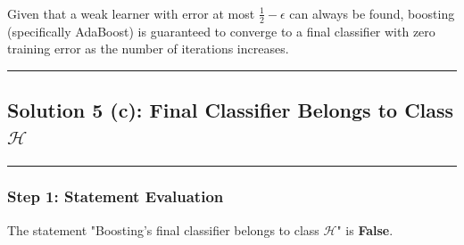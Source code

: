 \documentclass{article}
\begin{document}
\subsubsection*{}
\parbox{\textwidth}{
Given that a weak learner with error at most $\tfrac12 - \epsilon$ can always be found, boosting (specifically AdaBoost) is guaranteed to converge to a final classifier with zero training error as the number of iterations increases.
}

\noindent\rule{\textwidth}{0.4pt}

\newpage

\subsection*{Solution 5 (c): Final Classifier Belongs to Class $\mathcal H$}
\noindent\rule{\textwidth}{0.4pt}

\subsubsection*{Step 1: Statement Evaluation}
\parbox{\textwidth}{
The statement "Boosting's final classifier belongs to class $\mathcal H$" is \textbf{False}.
}
\end{document}
